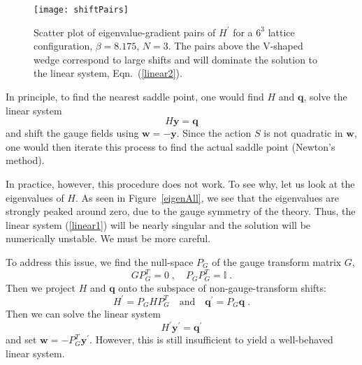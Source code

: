 \documentclass[preprint,aps,prd]{revtex4-2}
\newcommand{\be}{\begin{equation}}
\newcommand{\eq}{\end{equation}}
\begin{document}
\begin{figure}
\texttt{[image: shiftPairs]}
\caption{Scatter plot of eigenvalue-gradient pairs of $H^\prime$
  for a $6^3$ lattice configuration, $\beta = 8.175$, $N=3$.
  The pairs above the V-shaped wedge correspond to large shifts and
  will dominate the solution to the linear system, Eqn.~(\ref{linear2}).
  \label{shiftPairs}}
\end{figure}

In principle, to find the nearest saddle point, one would
find $H$ and $\mathbf{q}$, solve the linear system
\be
    H \mathbf{y} = \mathbf{q} \label{linear1}
\eq
and shift the gauge fields using $\mathbf{w} = -\mathbf{y}$.
Since the action $S$ is not quadratic in $\mathbf{w}$, one
would then iterate this process to find the actual saddle point
(Newton's method).

In practice, however, this procedure does not work.  To see why, let us
look at the eigenvalues of $H$.  As seen in Figure~\ref{eigenAll},
we see that the eigenvalues are strongly peaked around zero,
due to the gauge symmetry of the theory.  Thus, the linear
system (\ref{linear1}) will be nearly singular and
the solution will be numerically unstable.  We must be more careful.

To address this issue, we find the null-space $P_G$ of the gauge
transform matrix $G$,
\be
G P_G^T = 0 \; , \quad P_G P_G^T = \mathbb{I}\; .
\eq
Then we project $H$ and $\mathbf{q}$ onto
the subspace of non-gauge-transform shifts:
\be
         H^\prime = P_G H P_G^T \quad \mbox{and} \quad
         \mathbf{q}^\prime = P_G \mathbf{q} \; .
\eq
Then we can solve the linear system
\be
   H^\prime \mathbf{y}^\prime = \mathbf{q}^\prime \label{linear2}
\eq
and set $\mathbf{w} = - P_G^T \mathbf{y}^\prime$.  However, this is
still insufficient to yield a well-behaved linear system.
\end{document}
